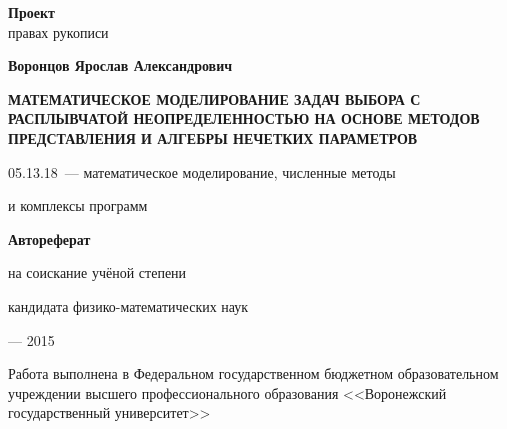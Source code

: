 \newcommand{\sfs}{\fontsize{14pt}{15pt}\selectfont}
\sfs %
\thispagestyle{empty}

\vspace{10mm}
\begin{flushright}
  \textbf{Проект}\\
   правах рукописи
\end{flushright}

\vspace{15mm}
\begin{center}
{\Large\bf Воронцов Ярослав Александрович}
\end{center}

\vspace{15mm}
\begin{center}
{\bf \LARGE \MakeUppercase {Математическое моделирование задач выбора с расплывчатой неопределенностью на основе методов представления и алгебры нечетких параметров}
\par}

\vspace{30mm}
{\Large
05.13.18~--- математическое моделирование, численные методы\par и комплексы программ
}

\vspace{15mm}
\textbf{Автореферат}\par
{} на соискание учёной степени\par
кандидата физико-математических наук
\end{center}

\vspace{40mm}
\begin{center}
{ --- 2015}
\end{center}

\newpage
\thispagestyle{empty}
\noindent Работа выполнена в Федеральном государственном бюджетном образовательном учреждении высшего профессионального образования <<Воронежский государственный университет>>

\vspace{10mm}

